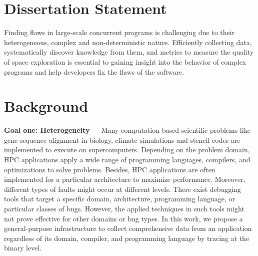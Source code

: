 \section{Dissertation Statement}
Finding flaws in large-scale concurrent programs is challenging due to their heterogeneous, complex and non-deterministic nature. Efficiently collecting data, systematically discover knowledge from them, and metrics to measure the quality of space exploration is essential to gaining insight into the behavior of complex programs and help developers fix the flaws of the software.

\section{Background}
\par{ \textbf{Goal one: Heterogeneity} ---
Many computation-based scientific problems like gene sequence alignment in biology, climate simulations and stencil codes are implemented to execute on supercomputers.
%
Depending on the problem domain, HPC applications apply a wide range of programming languages, compilers, and optimizations to solve problems.
%
Besides, HPC applications are often implemented for a particular architecture to maximize performance.
%
Moreover, different types of faults might occur at different levels.
%
There exist debugging tools that target a specific domain, architecture, programming language, or particular classes of bugs.
%
However, the applied techniques in such tools might not prove effective for other domains or bug types.
%
In this work, we propose a general-purpose infrastructure to collect comprehensive data from an application regardless of its domain, compiler, and programming language by tracing at the binary level.
%
}
